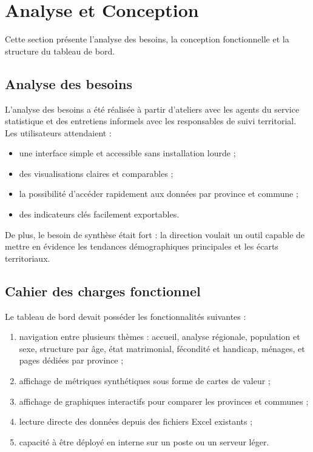 \documentclass[12pt,a4paper,oneside]{report}
\begin{document}
\chapter{Analyse et Conception}

Cette section présente l'analyse des besoins, la conception fonctionnelle et la structure du tableau de bord.

\section{Analyse des besoins}

L'analyse des besoins a été réalisée à partir d'ateliers avec les agents du service statistique et des entretiens informels avec les responsables de suivi territorial. Les utilisateurs attendaient :

\begin{itemize}[leftmargin=*]
  \item une interface simple et accessible sans installation lourde ;
  \item des visualisations claires et comparables ;
  \item la possibilité d'accéder rapidement aux données par province et commune ;
  \item des indicateurs clés facilement exportables.
\end{itemize}

De plus, le besoin de synthèse était fort : la direction voulait un outil capable de mettre en évidence les tendances démographiques principales et les écarts territoriaux.

\section{Cahier des charges fonctionnel}

Le tableau de bord devait posséder les fonctionnalités suivantes :

\begin{enumerate}[leftmargin=*]
  \item navigation entre plusieurs thèmes : accueil, analyse régionale, population et sexe, structure par âge, état matrimonial, fécondité et handicap, ménages, et pages dédiées par province ;
  \item affichage de métriques synthétiques sous forme de cartes de valeur ;
  \item affichage de graphiques interactifs pour comparer les provinces et communes ;
  \item lecture directe des données depuis des fichiers Excel existants ;
  \item capacité à être déployé en interne sur un poste ou un serveur léger.
\end{enumerate}
\end{document}
